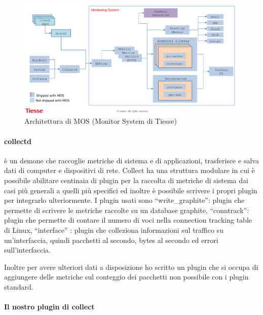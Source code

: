 \begin{figure}[]
    \label{fig:mos}
    \includegraphics[width=\hsize]{images/my_work/tiesse_mos.png}
    \caption{Architettura di MOS (Monitor System di Tiesse)}
    \centering
\end{figure}

\paragraph{collectd} è un demone che raccoglie metriche di sistema e di applicazioni, trasferisce e salva dati di computer e dispositivi di rete. Collect ha una struttura modulare in cui è possibile abilitare centinaia di plugin per la raccolta di metriche di sistema dai casi più generali a quelli più specifici ed inoltre è possibile scrivere i propri plugin per integrarlo ulteriormente. I plugin usati sono ``write\_graphite'': plugin che permette di scrivere le metriche raccolte su un database graphite, ``conntrack'': plugin che permette di contare il numero di voci nella connection tracking table di Linux, ``interface'' : plugin che colleziona informazioni sul traffico su un'interfaccia, quindi pacchetti al secondo, bytes al secondo ed errori sull'interfaccia. 

Inoltre per avere ulteriori dati a disposizione ho scritto un plugin che si occupa di aggiungere delle metriche sul conteggio dei pacchetti non possibile con i plugin standard.

\paragraph{Il nostro plugin di collect}

